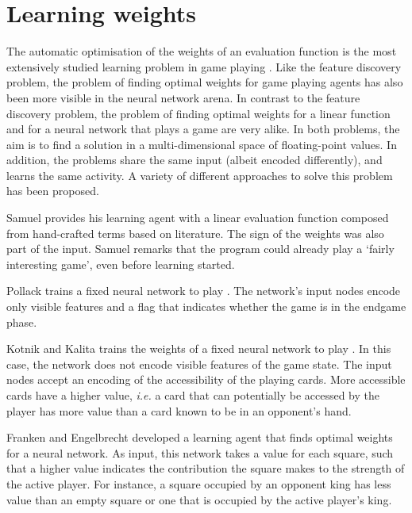 \section{Learning weights}
\label{sec:learning-weights}
The automatic optimisation of the weights of an evaluation function is the most extensively studied learning problem in game playing \cite{furnkranz:survey}. Like the feature discovery problem, the problem of finding optimal weights for game playing agents has also been more visible in the neural network arena.  In contrast to the feature discovery problem, the problem of finding optimal weights for a linear function and for a neural network that plays a game are very alike.  In both problems, the aim is to find a solution in a multi-dimensional space of floating-point values.  In addition, the problems share the same input (albeit encoded differently), and learns the same activity.  A variety of different approaches to solve this problem has been proposed. 

Samuel \cite{samuel:checkers} provides his  learning agent with a linear evaluation function composed from hand-crafted terms based on  literature.  The sign of the weights was also part of the input.  Samuel remarks that the program could already play a `fairly interesting game', even before learning started.  

Pollack \etal \cite{pollack:player} trains a fixed neural network to play .  The network's input nodes encode only visible features and a flag that indicates whether the game is in the endgame phase. 

Kotnik and Kalita \cite{kotnik:significance} trains the weights of a fixed neural network to play .  In this case, the network does not encode visible features of the game state. The input nodes accept an encoding of the accessibility of the playing cards.  More accessible cards have a higher value, {\it i.e.} a card that can potentially be accessed by the player has more value than a card known to be in an opponent's hand.   

Franken and Engelbrecht \cite{franken:checkers} developed a  learning agent that finds optimal weights for a neural network.  As input, this network takes a value for each square, such that a higher value indicates the contribution the square makes to the strength of the active player.  For instance, a square occupied by an opponent king has less value than an empty square or one that is occupied by the active player's king.  
 
